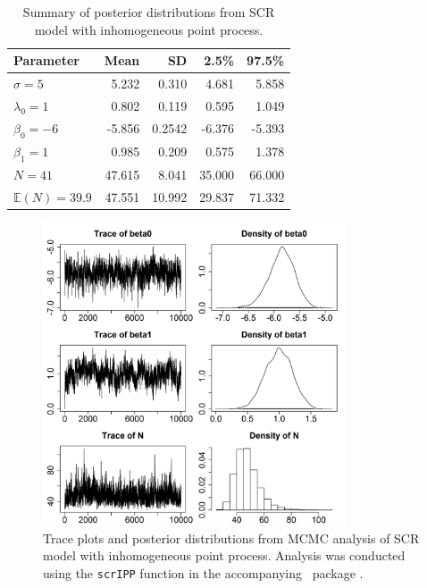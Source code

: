 \begin{table}[h!]
\centering
\caption{Summary of posterior distributions from SCR model with
  inhomogeneous point process. }
\begin{tabular}{lrrrr}
\hline
Parameter 	 	& Mean  	& SD    	& 2.5\% 	& 97.5\% \\
\hline
 $\sigma=5$ 	 	&  5.232 	&  0.310 	&  4.681 	&  5.858 \\
 $\lambda_0=1$ 	 	&  0.802 	&  0.119 	&  0.595 	&  1.049 \\
 $\beta_0=-6$ 	 	& -5.856        & 0.2542        & -6.376        & -5.393 \\
 $\beta_1=1$ 	 	&  0.985 	&  0.209 	&  0.575 	&  1.378 \\
 $N=41$ 	 	& 47.615 	&  8.041 	& 35.000 	& 66.000 \\
 $\mathbb{E}(N)=39.9$ 	& 47.551 	& 10.992 	& 29.837 	& 71.332 \\
\hline
\end{tabular}
\label{state-space.tab.simIPP}
\end{table}

\begin{figure}[h!]
  \centering
  \includegraphics[width=0.8\textwidth]{Ch11-Statespace/figs/fm1p}
  \caption{Trace plots and posterior distributions from MCMC analysis
    of SCR model with inhomogeneous point process. Analysis was
    conducted using the \texttt{scrIPP} function in the accompanying
    \R~package \scrbook.}
  \label{state-space.fig.fm1post}
\end{figure}




